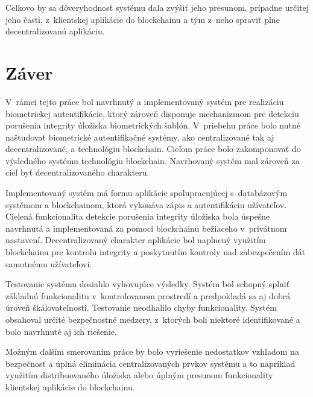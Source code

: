 Celkovo by sa dôveryhodnosť systému dala zvýšiť jeho presunom, prípadne určitej jeho časti, z~klientskej aplikácie do blockchainu a tým z~neho spraviť plne decentralizovanú aplikáciu.

\chapter{Záver}
V~rámci tejto práce bol navrhnutý a implementovaný systém pre realizáciu biometrickej autentifikácie, ktorý zároveň disponuje mechanizmom pre detekciu porušenia integrity úložiska biometrických šablón. V~priebehu práce bolo nutné naštudovať biometrické autentifikačné systémy, ako centralizované tak aj decentralizované, a technológiu blockchain. Cieľom práce bolo zakomponovať do výsledného systému technológiu blockchain. Navrhovaný systém mal zároveň za cieľ byť decentralizovaného charakteru.

Implementovaný systém má formu aplikácie spolupracujúcej s~databázovým systémom a blockchainom, ktorá vykonáva zápis a autentifikáciu užívateľov. Cielená funkcionalita detekcie porušenia integrity úložiska bola úspešne navrhnutá a implementovaná za pomoci blockchainu bežiaceho v~privátnom nastavení. Decentralizovaný charakter aplikácie bol naplnený využitím blockchainu pre kontrolu integrity a poskytnutím kontroly nad zabezpečením dát samotnému užívateľovi.

Testovanie systému dosiahlo vyhovujúce výsledky. Systém bol schopný splniť základnú funkcionalitu v~kontrolovanom prostredí a predpokladá sa aj dobrá úroveň škálovateľnosti. Testovanie neodhalilo chyby funkcionality. Systém obsahoval určité bezpečnostné medzery, z~ktorých boli niektoré identifikované a bolo navrhnuté aj ich riešenie.

Možným ďalším smerovaním práce by bolo vyriešenie nedostatkov vzhľadom na bezpečnosť a úplná eliminácia centralizovaných prvkov systému a to napríklad využitím distribuovaného úložiska alebo úplným presunom funkcionality klientskej aplikácie do blockchainu.

